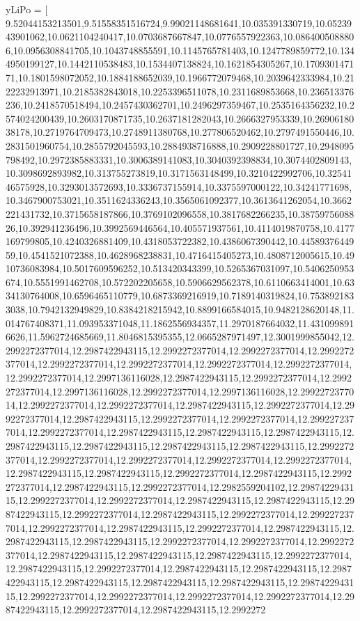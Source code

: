 \begin{pylabcode}[plotsession]
yLiPo = [ 9.52044153213501,9.51558351516724,9.99021148681641,10.035391330719,10.0523943901062,10.0621104240417,10.0703687667847,10.0776557922363,10.0864005088806,10.0956308841705,10.1043748855591,10.1145765781403,10.1247789859772,10.1344950199127,10.1442110538483,10.1534407138824,10.1621854305267,10.170930147171,10.1801598072052,10.1884188652039,10.1966772079468,10.2039642333984,10.2122232913971,10.2185382843018,10.2253396511078,10.2311689853668,10.236513376236,10.2418570518494,10.2457430362701,10.2496297359467,10.2535164356232,10.2574024200439,10.2603170871735,10.2637181282043,10.2666327953339,10.2690618038178,10.2719764709473,10.2748911380768,10.277806520462,10.2797491550446,10.2831501960754,10.2855792045593,10.2884938716888,10.2909228801727,10.2948095798492,10.2972385883331,10.3006389141083,10.3040392398834,10.3074402809143,10.3098692893982,10.313755273819,10.3171563148499,10.3210422992706,10.3254146575928,10.3293013572693,10.3336737155914,10.3375597000122,10.34241771698,10.3467900753021,10.3511624336243,10.3565061092377,10.3613641262054,10.3662221431732,10.3715658187866,10.3769102096558,10.3817682266235,10.3875975608826,10.392941236496,10.3992569446564,10.405571937561,10.4114019870758,10.4177169799805,10.4240326881409,10.4318053722382,10.4386067390442,10.4458937644959,10.4541521072388,10.4628968238831,10.4716415405273,10.4808712005615,10.4910736083984,10.5017609596252,10.513420343399,10.5265367031097,10.5406250953674,10.5551991462708,10.572202205658,10.5906629562378,10.6110663414001,10.6334130764008,10.6596465110779,10.6873369216919,10.7189140319824,10.7538921833038,10.7942132949829,10.8384218215942,10.8899166584015,10.9482128620148,11.014767408371,11.093953371048,11.1862556934357,11.2970187664032,11.4310998916626,11.5962724685669,11.8046815395355,12.0665287971497,12.3001999855042,12.2992272377014,12.2987422943115,12.2992272377014,12.2992272377014,12.2992272377014,12.2992272377014,12.2992272377014,12.2992272377014,12.2992272377014,12.2992272377014,12.2997136116028,12.2987422943115,12.2992272377014,12.2992272377014,12.2997136116028,12.2992272377014,12.2997136116028,12.2992272377014,12.2992272377014,12.2992272377014,12.2987422943115,12.2992272377014,12.2992272377014,12.2987422943115,12.2992272377014,12.2992272377014,12.2992272377014,12.2992272377014,12.2987422943115,12.2987422943115,12.2987422943115,12.2987422943115,12.2987422943115,12.2987422943115,12.2987422943115,12.2992272377014,12.2992272377014,12.2992272377014,12.2992272377014,12.2992272377014,12.2987422943115,12.2987422943115,12.2992272377014,12.2987422943115,12.2992272377014,12.2987422943115,12.2992272377014,12.2982559204102,12.2987422943115,12.2992272377014,12.2992272377014,12.2987422943115,12.2987422943115,12.2987422943115,12.2992272377014,12.2987422943115,12.2992272377014,12.2992272377014,12.2992272377014,12.2987422943115,12.2992272377014,12.2987422943115,12.2987422943115,12.2987422943115,12.2992272377014,12.2992272377014,12.2992272377014,12.2987422943115,12.2987422943115,12.2987422943115,12.2992272377014,12.2987422943115,12.2992272377014,12.2987422943115,12.2987422943115,12.2987422943115,12.2987422943115,12.2987422943115,12.2987422943115,12.2987422943115,12.2992272377014,12.2992272377014,12.2992272377014,12.2992272377014,12.2987422943115,12.2992272377014,12.2987422943115,12.2992272
\end{pylabcode}
